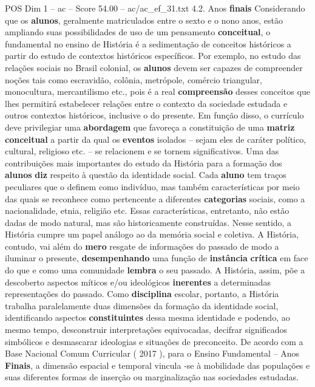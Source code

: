 \begin{textsample}{POS Dim 1 – ac – Score 54.00 – ac/ac\_ef\_31.txt}  \label{ex:f1_pos_172}
4.2.
Anos \textbf{finais} Considerando que os \textbf{alunos}, geralmente matriculados entre o sexto e o nono anos, estão ampliando suas possibilidades de uso de um pensamento \textbf{conceitual}, o fundamental no ensino de História é a sedimentação de conceitos históricos a partir do estudo de contextos históricos específicos.
Por exemplo, no estudo das relações sociais no Brasil colonial, os \textbf{alunos} devem ser capazes de compreender noções tais como escravidão, colônia, metrópole, comércio triangular, monocultura, mercantilismo etc., pois é a real \textbf{compreensão} desses conceitos que lhes permitirá estabelecer relações entre o contexto da sociedade estudada e outros contextos históricos, inclusive o do presente.
Em função disso, o currículo deve privilegiar uma \textbf{abordagem} que favoreça a constituição de uma \textbf{matriz} \textbf{conceitual} a partir da qual os \textbf{eventos} isolados – sejam eles de caráter político, cultural, religioso etc. – se relacionem e se tornem significativos.
Uma das contribuições mais importantes do estudo da História para a formação dos \textbf{alunos} \textbf{diz} respeito à questão da identidade social.
Cada \textbf{aluno} tem traços peculiares que o definem como indivíduo, mas também características por meio das quais se reconhece como pertencente a diferentes \textbf{categorias} sociais, como a nacionalidade, etnia, religião etc.
Essas características, entretanto, não estão dadas de modo natural, mas são historicamente construídas.
Nesse sentido, a História cumpre um papel análogo ao da memória social e coletiva.
A História, contudo, vai além do \textbf{mero} resgate de informações do passado de modo a iluminar o presente, \textbf{desempenhando} uma função de \textbf{instância} \textbf{crítica} em face do que e como uma comunidade \textbf{lembra} o seu passado.
A História, assim, põe a descoberto aspectos míticos e/ou ideológicos \textbf{inerentes} a determinadas representações do passado.
Como \textbf{disciplina} escolar, portanto, a História trabalha paralelamente duas dimensões da formação da identidade social, identificando aspectos \textbf{constituintes} dessa mesma identidade e podendo, ao mesmo tempo, desconstruir interpretações equivocadas, decifrar significados simbólicos e desmascarar ideologias e situações de preconceito.
De acordo com a Base Nacional Comum Curricular ( 2017 ), para o Ensino Fundamental – Anos \textbf{Finais}, a dimensão espacial e temporal vincula -se à mobilidade das populações e suas diferentes formas de inserção ou marginalização nas sociedades estudadas.

\end{textsample}
